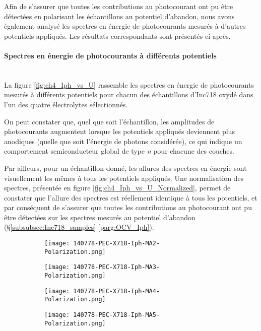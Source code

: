 \begin{refsection}
    Afin de s’assurer que toutes les contributions au photocourant ont pu être
    détectées en polarisant les échantillons
    au potentiel d’abandon, nous avons également analysé les spectres en énergie
    de photocourants mesurés à d’autres
    potentiels appliqués. Les résultats correspondants sont présentés ci-après.


    \paragraph{Spectres en énergie de photocourants à différents potentiels}\label{par:U_Iph}
    \mbox{}\\
    La figure \ref{fig:ch4_Iph_vs_U} rassemble les spectres en énergie de photocourants mesurés
    à différents potentiels pour chacun des échantillons d’Inc718 oxydé dans 
    l’un des quatre électrolytes sélectionnés. 

    On peut constater que, quel que soit l’échantillon, les amplitudes de 
    photocourants augmentent lorsque les potentiels appliqués deviennent plus
    anodiques (quelle que soit l’énergie de photons considérée), ce qui indique
    un comportement semiconducteur global de type \emph{n} pour chacune des couches. 

    Par ailleurs, pour un échantillon donné, les allures des spectres en énergie
    sont visuellement les mêmes à  tous les potentiels appliqués. Une normalisation
    des spectres, présentée en figure \ref{fig:ch4_Iph_vs_U_Normalized}, permet de constater que l’allure des spectres
    est réellement identique à tous les potentiels, et par conséquent de s’assurer que
    toutes les contributions au photocourant ont pu être détectées sur les spectres
    mesurés au potentiel d’abandon (\S \ref{subsubsec:Inc718_samples} \ref{parg:OCV_Iph}).


    \begin{figure}[H]
            \centering
            \begin{subfigure}[b]{0.48\textwidth}
                \texttt{[image: 140778-PEC-X718-Iph-MA2-Polarization.png]}
                \caption{}
                \label{}
            \end{subfigure}
            \begin{subfigure}[b]{0.48\textwidth}
                \texttt{[image: 140778-PEC-X718-Iph-MA3-Polarization.png]}
                \caption{}
                \label{}
            \end{subfigure}
            \begin{subfigure}[b]{0.48\textwidth}
                \texttt{[image: 140778-PEC-X718-Iph-MA4-Polarization.png]}
                \caption{}
                \label{}
            \end{subfigure}
            \begin{subfigure}[b]{0.48\textwidth}
                \texttt{[image: 140778-PEC-X718-Iph-MA5-Polarization.png]}
                \caption{}
                \label{}
            \end{subfigure}


\end{figure}
\end{refsection}
